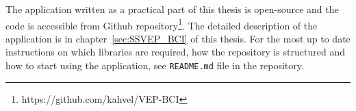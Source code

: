 \begin{appendices}
The application written as a practical part of this thesis is open-source and the code is accessible from Github repository\footnote{https://github.com/kahvel/VEP-BCI}. The detailed description of the application is in chapter~\ref{sec:SSVEP_BCI} of this thesis. For the most up to date instructions on which libraries are required, how the repository is structured and how to start using the application, see \texttt{README.md} file in the repository.

\end{appendices}
